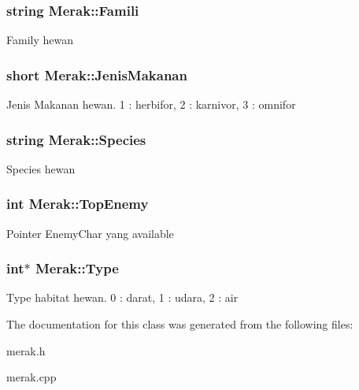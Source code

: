 \subsubsection[{\texorpdfstring{Famili}{Famili}}]{\setlength{\rightskip}{0pt plus 5cm}string Merak\+::\+Famili\hspace{0.3cm}{\ttfamily [protected]}}\hypertarget{class_merak_ab8646f355a3376626fa1dcb65c01e05c}{}\label{class_merak_ab8646f355a3376626fa1dcb65c01e05c}
Family hewan 
\subsubsection[{\texorpdfstring{Jenis\+Makanan}{JenisMakanan}}]{\setlength{\rightskip}{0pt plus 5cm}short Merak\+::\+Jenis\+Makanan\hspace{0.3cm}{\ttfamily [protected]}}\hypertarget{class_merak_a167f51348667b9244da278b166a883bd}{}\label{class_merak_a167f51348667b9244da278b166a883bd}
Jenis Makanan hewan. 1 \+: herbifor, 2 \+: karnivor, 3 \+: omnifor 
\subsubsection[{\texorpdfstring{Species}{Species}}]{\setlength{\rightskip}{0pt plus 5cm}string Merak\+::\+Species\hspace{0.3cm}{\ttfamily [protected]}}\hypertarget{class_merak_a93a71597be852ba02e83e5ae8d34c115}{}\label{class_merak_a93a71597be852ba02e83e5ae8d34c115}
Species hewan 
\subsubsection[{\texorpdfstring{Top\+Enemy}{TopEnemy}}]{\setlength{\rightskip}{0pt plus 5cm}int Merak\+::\+Top\+Enemy\hspace{0.3cm}{\ttfamily [protected]}}\hypertarget{class_merak_ace55be82878a446afa663c843b7aedc1}{}\label{class_merak_ace55be82878a446afa663c843b7aedc1}
Pointer Enemy\+Char yang available 
\subsubsection[{\texorpdfstring{Type}{Type}}]{\setlength{\rightskip}{0pt plus 5cm}int$\ast$ Merak\+::\+Type\hspace{0.3cm}{\ttfamily [protected]}}\hypertarget{class_merak_afc4c29c5ceae86542a54c8f73445097e}{}\label{class_merak_afc4c29c5ceae86542a54c8f73445097e}
Type habitat hewan. 0 \+: darat, 1 \+: udara, 2 \+: air 

The documentation for this class was generated from the following files\+:\begin{DoxyCompactItemize}
\item 
merak.\+h\item 
merak.\+cpp\end{DoxyCompactItemize}
